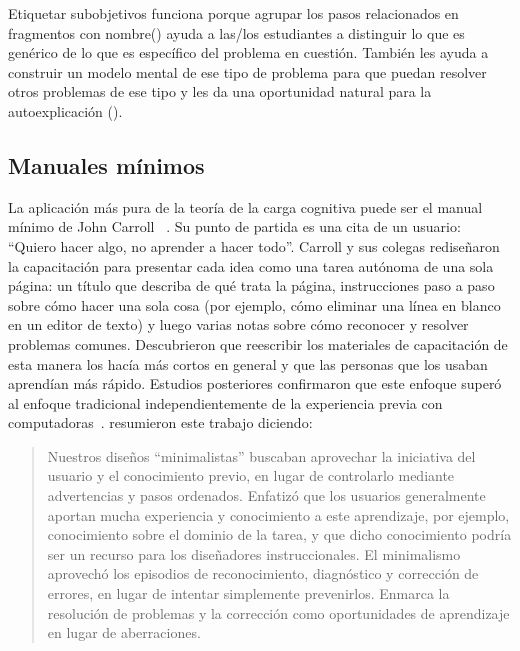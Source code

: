 Etiquetar subobjetivos funciona porque agrupar los pasos relacionados en fragmentos con nombre()
ayuda a las/los estudiantes a distinguir lo que es genérico de lo que es específico del problema en cuestión.
También les ayuda a construir un modelo mental de ese tipo de problema
para que puedan resolver otros problemas de ese tipo
y les da una oportunidad natural para la autoexplicación ().

\subsection*{Manuales mínimos}

La aplicación más pura de la teoría de la carga cognitiva puede ser el manual mínimo de
John Carroll ~\cite{Carr1987,Carr2014}.
Su punto de partida es una cita de un usuario: ``Quiero hacer algo, no aprender a hacer todo''.
Carroll y sus colegas rediseñaron la capacitación para presentar cada idea como una tarea autónoma de una sola página:
un título que describa de qué trata la página,
instrucciones paso a paso sobre cómo hacer una sola cosa
(por ejemplo, cómo eliminar una línea en blanco en un editor de texto)
y luego varias notas sobre cómo reconocer y resolver problemas comunes.
Descubrieron que reescribir los materiales de capacitación de esta manera los hacía más cortos en general
y que las personas que los usaban aprendían más rápido.
Estudios posteriores confirmaron que este enfoque superó al enfoque tradicional
independientemente de la experiencia previa con computadoras~\cite{Lazo1993}.
\cite{Carr2014} resumieron este trabajo diciendo:

\begin{quote}

  Nuestros diseños ``minimalistas'' buscaban aprovechar la iniciativa del usuario y el conocimiento previo,
  en lugar de controlarlo mediante advertencias y pasos ordenados.
  Enfatizó que los usuarios generalmente aportan mucha experiencia y conocimiento a este aprendizaje,
  por ejemplo,
  conocimiento sobre el dominio de la tarea,
  y que dicho conocimiento podría ser un recurso para los diseñadores instruccionales.
  El minimalismo aprovechó los episodios de reconocimiento, diagnóstico y corrección de errores,
  en lugar de intentar simplemente prevenirlos.
  Enmarca la resolución de problemas y la corrección como oportunidades de aprendizaje en lugar de aberraciones.

\end{quote}


